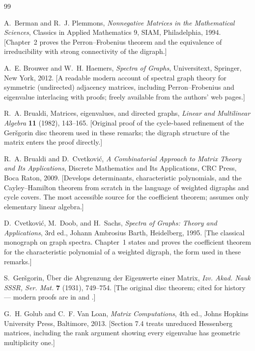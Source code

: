 \documentclass[11pt, fleqn]{amsart}
\theoremstyle{remark}
\begin{document}
\begin{thebibliography}{99}

A.~Berman and R.~J. Plemmons,
\emph{Nonnegative Matrices in the Mathematical Sciences},
Classics in Applied Mathematics 9, SIAM, Philadelphia, 1994.
[Chapter~2 proves the Perron--Frobenius theorem and the equivalence of
irreducibility with strong connectivity of the digraph.]

A.~E. Brouwer and W.~H. Haemers,
\emph{Spectra of Graphs},
Universitext, Springer, New York, 2012.
[A readable modern account of spectral graph theory for symmetric
(undirected) adjacency matrices, including Perron--Frobenius and
eigenvalue interlacing with proofs; freely available from the authors'
web pages.]

R.~A. Brualdi,
Matrices, eigenvalues, and directed graphs,
\emph{Linear and Multilinear Algebra} \textbf{11} (1982), 143--165.
[Original proof of the cycle-based refinement of the Ger\v{s}gorin disc
theorem used in these remarks; the digraph structure of the matrix
enters the proof directly.]

R.~A. Brualdi and D.~Cvetkovi\'c,
\emph{A Combinatorial Approach to Matrix Theory and Its Applications},
Discrete Mathematics and Its Applications, CRC Press, Boca Raton, 2009.
[Develops determinants, characteristic polynomials, and the
Cayley--Hamilton theorem from scratch in the language of weighted
digraphs and cycle covers. The most accessible source for the
coefficient theorem; assumes only elementary linear algebra.]

D.~Cvetkovi\'c, M.~Doob, and H.~Sachs,
\emph{Spectra of Graphs: Theory and Applications},
3rd ed., Johann Ambrosius Barth, Heidelberg, 1995.
[The classical monograph on graph spectra. Chapter~1 states and proves
the coefficient theorem for the characteristic polynomial of a weighted
digraph, the form used in these remarks.]

S.~Ger\v{s}gorin,
\"Uber die Abgrenzung der Eigenwerte einer Matrix,
\emph{Izv. Akad. Nauk SSSR, Ser. Mat.} \textbf{7} (1931), 749--754.
[The original disc theorem; cited for history --- modern proofs are in
\cite{HJ13} and \cite{Varga04}.]

G.~H. Golub and C.~F. Van Loan,
\emph{Matrix Computations},
4th ed., Johns Hopkins University Press, Baltimore, 2013.
[Section 7.4 treats unreduced Hessenberg matrices, including the rank
argument showing every eigenvalue has geometric multiplicity one.]


\end{thebibliography}
\end{document}
